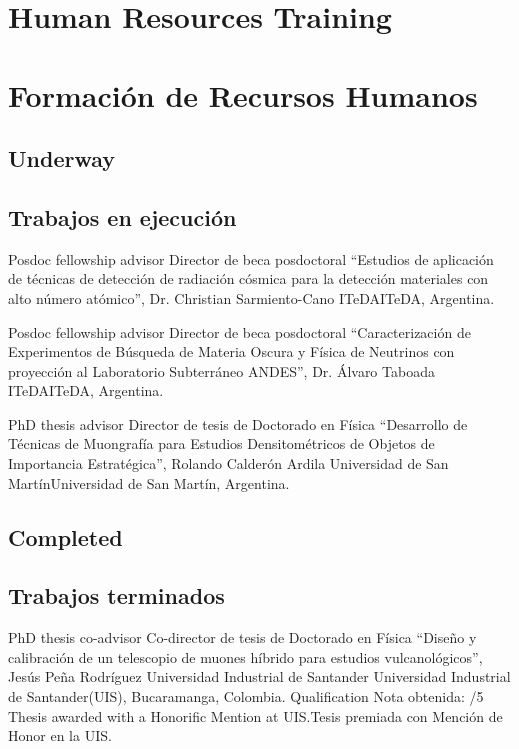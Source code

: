 \ifeng
\section*{Human Resources Training}
\else
\section*{Formación de Recursos Humanos}
\fi

\ifeng
	\subsection*{Underway}
\else
	\subsection*{Trabajos en ejecución}
\fi

\ifeng
Posdoc fellowship advisor
\else
Director de beca posdoctoral
\fi
``Estudios de aplicación de técnicas de detección de radiación cósmica para la detección materiales con alto número atómico'', Dr. Christian Sarmiento-Cano \at \ifeng ITeDA\else ITeDA\fi, Argentina.

\ifeng
Posdoc fellowship advisor
\else
Director de beca posdoctoral
\fi
``Caracterización de Experimentos de Búsqueda de Materia Oscura y Física de Neutrinos con proyección al Laboratorio Subterráneo ANDES'', Dr. Álvaro Taboada \at \ifeng ITeDA\else ITeDA\fi, Argentina.

\ifeng
PhD thesis advisor
 \else
Director de tesis de Doctorado en Física
 \fi
``Desarrollo de Técnicas de Muongrafía para Estudios Densitométricos de Objetos de Importancia Estratégica'', Rolando Calderón Ardila \at \ifeng Universidad de San Martín\else Universidad de San Martín\fi, Argentina.

\ifeng
\subsection*{Completed}
\else
\subsection*{Trabajos terminados}
\fi

\ifeng
PhD thesis co-advisor
 \else
Co-director de tesis de Doctorado en Física
 \fi
``Diseño y calibración de un telescopio de muones híbrido para estudios vulcanológicos'', Jesús Peña Rodríguez \at \ifeng Universidad Industrial de Santander \else Universidad Industrial de Santander\fi (UIS), Bucaramanga, Colombia. \ifeng Qualification \else Nota obtenida: /5 \ifeng Thesis awarded with a Honorific Mention at UIS.\else Tesis premiada con Mención de Honor en la UIS.\fi


